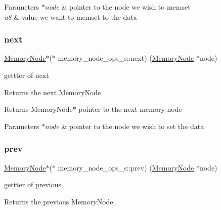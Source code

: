 \begin{DoxyParams}{Parameters}
{\em $\ast$node} & pointer to the node we wish to memset \\
\hline
{\em u8} & value we want to memset to the data \\
\hline
\end{DoxyParams}
\mbox{\label{structmemory__node__ops__s_a87ce72f198cd7c9df08a90d9cebbdde9}} 
\subsubsection{\texorpdfstring{next}{next}}
{\footnotesize\ttfamily \hyperlink{structmemory__node__s}{Memory\+Node}$\ast$($\ast$ memory\+\_\+node\+\_\+ops\+\_\+s\+::next) (\hyperlink{structmemory__node__s}{Memory\+Node} $\ast$node)}



gettter of next 

Returns the next Memory\+Node

\begin{DoxyReturn}{Returns}
Memory\+Node$\ast$ pointer to the next memory node 
\end{DoxyReturn}

\begin{DoxyParams}{Parameters}
{\em $\ast$node} & pointer to the node we wish to set the data \\
\hline
\end{DoxyParams}
\mbox{\label{structmemory__node__ops__s_a64ffb2209e35813b777210e7644bc090}} 
\subsubsection{\texorpdfstring{prev}{prev}}
{\footnotesize\ttfamily \hyperlink{structmemory__node__s}{Memory\+Node}$\ast$($\ast$ memory\+\_\+node\+\_\+ops\+\_\+s\+::prev) (\hyperlink{structmemory__node__s}{Memory\+Node} $\ast$node)}



gettter of previous 

Returns the previous Memory\+Node

